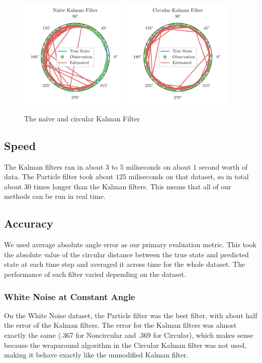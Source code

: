 \documentclass[11pt]{amsart}
\begin{document}
\begin{figure}[htp]
    \centering
    \includegraphics[width=0.47\textwidth]{actual_paper_graphs/non_altered_kalman.pdf}\hfill
    \includegraphics[width=0.47\textwidth]{actual_paper_graphs/altered_kalman.pdf}\hfill
    \caption{The naïve and circular Kalman Filter}
    \label{fig:simple_kalman}
\end{figure}

\subsection{Speed}
The Kalman filters ran in about $3$ to $5$ miliseconds on about 1 second worth of data. The Particle filter took about $125$ miliseconds on that dataset, so in total about $30$ times longer than the Kalman filters.
This means that all of our methods can be run in real time. 
\subsection{Accuracy}
We used average absolute angle error as our primary evaluation metric. This took the absolute value of the circular distance between the true state and predicted state at each time step and averaged it across time for the whole dataset. The performance of each filter varied depending on the dataset.
\subsubsection{White Noise at Constant Angle}
On the White Noise dataset, the Particle filter was the best filter, with about half the error of the Kalman filters. The error for the Kalman filters was almost exactly the same (.367 for Noncircular and .369 for Circular), which makes sense because the wraparound algorithm in the Circular Kalman filter was not used, making it behave exactly like the unmodified Kalman filter.
\end{document}

